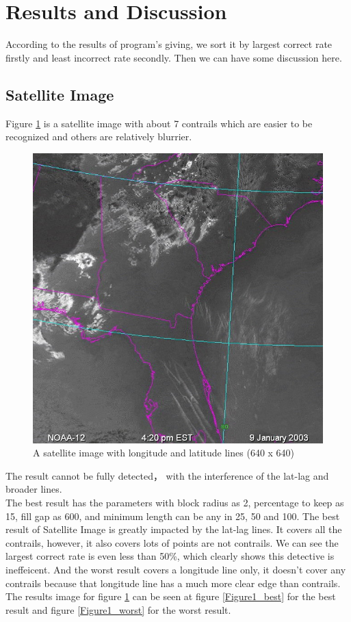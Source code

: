 \section{Results and Discussion}
According to the results of program's giving, we sort it by largest correct rate firstly and least incorrect rate secondly. Then we can have some discussion here.

\clearpage
\subsection{Satellite Image}

Figure \ref{figure1} is a satellite image with about 7 contrails which are easier to be recognized and others are relatively blurrier.

\begin{figure}[htb!]
\centering
\includegraphics[width=5in]{pic/figure1.jpg}
\caption{A satellite image with longitude and latitude lines (640 x 640)}
\label{figure1}
\end{figure}

The result cannot be fully detected， with the interference of the lat-lag and broader lines.\\
The best result has the parameters with block radius as 2, percentage to keep as 15, fill gap as 600, and minimum length can be any in 25, 50 and 100. The best result of Satellite Image is greatly impacted by the lat-lag lines. It covers all the contrails, however, it also covers lots of points are not contrails. We can see the largest correct rate is even less than 50\%, which clearly shows this detective is ineffeicent. And the worst result covers a longitude line only, it doesn’t cover any contrails because that longitude line has a much more clear edge than contrails. The results image for figure \ref{figure1} can be seen at figure \ref{Figure1_best} for the best result and figure \ref{Figure1_worst} for the worst result.

